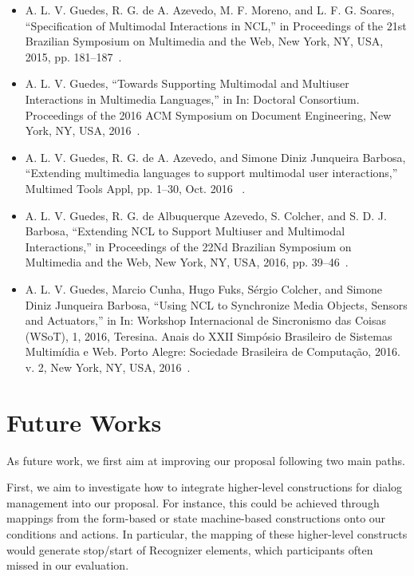 \documentclass[
  doutorado,
  american
]{ThesisPUC}
\begin{document}
\begin{itemize}
	\item	 A. L. V. Guedes, R. G. de A. Azevedo, M. F. Moreno, and L. F. G.
	Soares, “Specification of Multimodal Interactions in NCL,” in Proceedings of
	the 21st Brazilian Symposium on Multimedia and the Web, New York, NY, USA,
	2015, pp. 181–187~\cite{guedes_specification_2015}.
	\item	A. L. V. Guedes, “Towards Supporting Multimodal and Multiuser
	Interactions in Multimedia Languages,” in In: Doctoral Consortium. Proceedings
	of the 2016 ACM Symposium on Document Engineering, New York, NY, USA,
	2016~\cite{guedes_towards_2016}.
	\item	A. L. V. Guedes, R. G. de A. Azevedo, and Simone Diniz Junqueira
	Barbosa, “Extending multimedia languages to support multimodal user
	interactions,” Multimed Tools Appl, pp. 1–30, Oct. 2016
	~\cite{guedes_extending_2016}.
	\item	A. L. V. Guedes, R. G. de Albuquerque Azevedo, S. Colcher, and S. D. J.
	Barbosa, “Extending NCL to Support Multiuser and Multimodal Interactions,” in
	Proceedings of the 22Nd Brazilian Symposium on Multimedia and the Web, New
	York, NY, USA, 2016, pp. 39–46~\cite{guedes_extending_2016-1}.
	\item	A. L. V. Guedes, Marcio Cunha, Hugo Fuks, Sérgio Colcher, and Simone
	Diniz Junqueira Barbosa, “Using NCL to Synchronize Media Objects, Sensors and
	Actuators,” in In: Workshop Internacional de Sincronismo das Coisas (WSoT), 1,
	2016, Teresina. Anais do XXII Simpósio Brasileiro de Sistemas Multimídia e
	Web. Porto Alegre: Sociedade Brasileira de Computação, 2016. v. 2, New York,
	NY, USA, 2016~\cite{guedes_using_2016}.	

\end{itemize}

\section{Future Works}
\label{sec:future}

As future work, we first aim at improving our proposal following two main paths.

First, we aim to investigate how to integrate higher-level constructions for
dialog management into our proposal. For instance, this could be achieved
through mappings from the form-based or state machine-based constructions onto
our conditions and actions. In particular, the mapping of these higher-level
constructs would generate stop/start of Recognizer elements, which participants
often missed in our evaluation.
\end{document}

